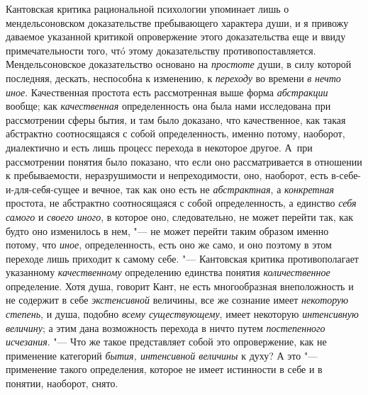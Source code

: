 Кантовская критика рациональной психологии упоминает лишь о
мендельсоновском доказательстве пребывающего характера души, и я привожу
даваемое указанной критикой опровержение этого доказательства еще и ввиду
примечательности того, чтó этому доказательству
противопоставляется.
Мендельсоновское доказательство основано на {\em простоте} души, в
силу которой последняя, дескать, неспособна к изменению, к
{\em переходу} во времени {\em в} {\em нечто иное}.
Качественная простота есть рассмотренная выше форма
{\em абстракции} вообще; как {\em качественная}
определенность она была нами исследована при рассмотрении
сферы бытия, и там было доказано, что качественное, как такая абстрактно
соотносящаяся с собой определенность, именно потому, наоборот, диалектично
и есть лишь процесс перехода в некоторое другое. А~при рассмотрении понятия
было показано, что если оно рассматривается в отношении к пребываемости,
неразрушимости и непреходимости, оно, наоборот, есть
в-себе-и-для-себя-сущее и вечное, так как оно есть не
{\em абстрактная}, а {\em конкретная}
простота, не абстрактно соотносящаяся с собой определенность,
а единство {\em себя самого} и {\em своего иного},
в которое оно, следовательно, не может перейти так,
как будто оно изменилось в нем, "--- не может перейти таким
образом именно потому, что {\em иное},
определенность, есть оно же само, и оно поэтому в этом
переходе лишь приходит к самому себе. "--- Кантовская критика
противополагает указанному {\em качественному}
определению единства понятия {\em количественное}
определение. Хотя душа, говорит Кант, не есть многообразная
внеположность и не содержит в себе {\em экстенсивной}
величины, все же сознание имеет {\em некоторую степень},
и душа, подобно {\em всему существующему}, имеет некоторую
{\em интенсивную величину}; а этим дана возможность перехода в ничто путем
{\em постепенного исчезания}. "---
Что же такое представляет собой это опровержение, как не
применение категорий {\em бытия, интенсивной величины} к духу? А это
"--- применение такого определения, которое не имеет истинности
в себе и в понятии, наоборот, снято.

